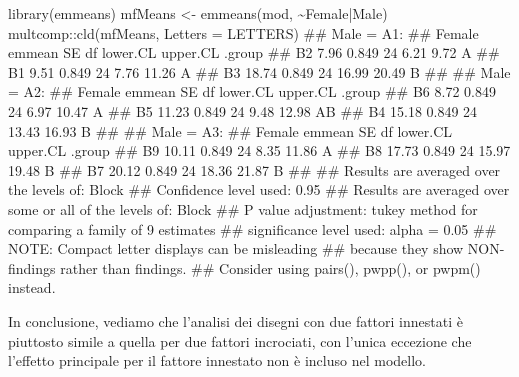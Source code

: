 \documentclass[a4paper,12pt,oneside]{book}
\newenvironment{Shaded}{\begin{snugshade}}{\end{snugshade}}
\newcommand{\SpecialCharTok}[1]{#1}
\newcommand{\DocumentationTok}[1]{#1}
\newcommand{\OtherTok}[1]{#1}
\newcommand{\FunctionTok}[1]{#1}
\newcommand{\AttributeTok}[1]{#1}
\newcommand{\AlertTok}[1]{#1}
\newcommand{\NormalTok}[1]{#1}
\begin{document}
\begin{Shaded}
\begin{Highlighting}[]
\FunctionTok{library}\NormalTok{(emmeans)}
\NormalTok{mfMeans }\OtherTok{\textless{}{-}} \FunctionTok{emmeans}\NormalTok{(mod, }\SpecialCharTok{\textasciitilde{}}\NormalTok{Female}\SpecialCharTok{|}\NormalTok{Male)}
\NormalTok{multcomp}\SpecialCharTok{::}\FunctionTok{cld}\NormalTok{(mfMeans, }\AttributeTok{Letters =}\NormalTok{ LETTERS)}
\DocumentationTok{\#\# Male = A1:}
\DocumentationTok{\#\#  Female emmean    SE df lower.CL upper.CL .group}
\DocumentationTok{\#\#  B2       7.96 0.849 24     6.21     9.72  A    }
\DocumentationTok{\#\#  B1       9.51 0.849 24     7.76    11.26  A    }
\DocumentationTok{\#\#  B3      18.74 0.849 24    16.99    20.49   B   }
\DocumentationTok{\#\# }
\DocumentationTok{\#\# Male = A2:}
\DocumentationTok{\#\#  Female emmean    SE df lower.CL upper.CL .group}
\DocumentationTok{\#\#  B6       8.72 0.849 24     6.97    10.47  A    }
\DocumentationTok{\#\#  B5      11.23 0.849 24     9.48    12.98  AB   }
\DocumentationTok{\#\#  B4      15.18 0.849 24    13.43    16.93   B   }
\DocumentationTok{\#\# }
\DocumentationTok{\#\# Male = A3:}
\DocumentationTok{\#\#  Female emmean    SE df lower.CL upper.CL .group}
\DocumentationTok{\#\#  B9      10.11 0.849 24     8.35    11.86  A    }
\DocumentationTok{\#\#  B8      17.73 0.849 24    15.97    19.48   B   }
\DocumentationTok{\#\#  B7      20.12 0.849 24    18.36    21.87   B   }
\DocumentationTok{\#\# }
\DocumentationTok{\#\# Results are averaged over the levels of: Block }
\DocumentationTok{\#\# Confidence level used: 0.95 }
\DocumentationTok{\#\# Results are averaged over some or all of the levels of: Block }
\DocumentationTok{\#\# P value adjustment: tukey method for comparing a family of 9 estimates }
\DocumentationTok{\#\# significance level used: alpha = 0.05 }
\DocumentationTok{\#\# }\AlertTok{NOTE}\DocumentationTok{: Compact letter displays can be misleading}
\DocumentationTok{\#\#       because they show NON{-}findings rather than findings.}
\DocumentationTok{\#\#       Consider using \textquotesingle{}pairs()\textquotesingle{}, \textquotesingle{}pwpp()\textquotesingle{}, or \textquotesingle{}pwpm()\textquotesingle{} instead.}
\end{Highlighting}
\end{Shaded}

In conclusione, vediamo che l'analisi dei disegni con due fattori innestati è piuttosto simile a quella per due fattori incrociati, con l'unica eccezione che l'effetto principale per il fattore innestato non è incluso nel modello.
\end{document}
